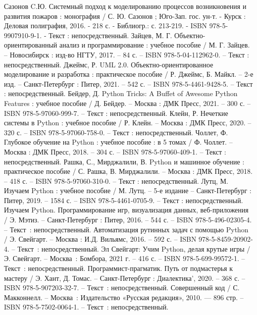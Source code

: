 \begin{thebibliography}{9}
	\bibitem{} Сазонов C.Ю.    Системный подход к моделированию процессов возникновения и развития пожаров : монография / С. Ю. Сазонов ; Юго-Зап. гос. ун-т. - Курск : Деловая полиграфия, 2016. - 218 с. - Библиогр.: с. 213-219. - ISBN 978-5-9907910-9-1. - Текст : непосредственный.
	 Зайцев, М. Г. Объектно-ориентированный анализ и программирование : учебное пособие / М. Г. Зайцев. – Новосибирск : изд-во НГТУ, 2017. – 84 с. – ISBN 978-5-04-112962-0. – Текст : непосредственный.
	 Джеймс, Р. UML 2.0. Объектно-ориентированное моделирование и разработка : практическое пособие / Р. Джеймс, Б. Майкл. – 2-е изд. – Санкт-Петербург : Питер, 2021. – 542 с. – ISBN 978-5-4461-9428-5. – Текст : непосредственный.
	 Бейдер, Д. Python Tricks: A Buffet of Awesome Python Features : учебное пособие / Д. Бейдер. – Москва : ДМК Пресс, 2021. – 300 с. – ISBN 978-5-97060-999-7. – Текст : непосредственный.
	 Клейн, Р. Нечеткие системы в Python : учебное пособие / Р. Клейн. – Москва : ДМК Пресс, 2020. – 320 с. – ISBN 978-5-97060-758-0. – Текст : непосредственный.
	 Чоллет, Ф. Глубокое обучение на Python : учебное пособие : в 5 томах / Ф. Чоллет. – Москва : ДМК Пресс, 2018. – 304 с. – ISBN 978-5-97060-409-1. – Текст : непосредственный.
	 Рашка, С., Мирджалили, В. Python и машинное обучение : практическое пособие / С. Рашка, В. Мирджалили. – Москва : ДМК Пресс, 2018. – 418 с. – ISBN 978-5-97060-310-0. – Текст : непосредственный.
	 Лутц, М. Изучаем Python : учебное пособие  / М. Лутц. –  5-е издание – Санкт-Петербург : Питер, 2019. – 1584 с. – ISBN 978-5-4461-0705-9. – Текст : непосредственный.
	 Изучаем Python. Программирование игр, визуализация данных, веб-приложения / Э. Мэтиз. – Санкт-Петербург : Питер, 2016. – 544 с. – ISBN 978-5-496-02305-4. – Текст~: непосредственный.
	 Автоматизация рутинных задач с помощью Python / Э. Свейгарт. – Москва : И.Д. Вильямс, 2016. – 592 с. – ISBN 978-5-8459-20902-4. – Текст~: непосредственный.
	Эл Свейгарт: Учим Python, делая крутые игры / Э. Свейгарт. – Москва~:  Бомбора, 2021 г. – 416 с. – ISBN 978-5-699-99572-1. – Текст~: непосредственный.
	Программист-прагматик. Путь от подмастерья к мастеру  / Э. Хант, Д. Томас. – Санкт-Петербург : Диалектика', 2020. – 368 с. – ISBN 978-5-907203-32-7. – Текст~: непосредственный.
	Совершенный код / С. Макконнелл. – Москва~: Издательство «Русская редакция», 2010. — 896 стр. – ISBN 978-5-7502-0064-1. – Текст~: непосредственный.

\end{thebibliography}
